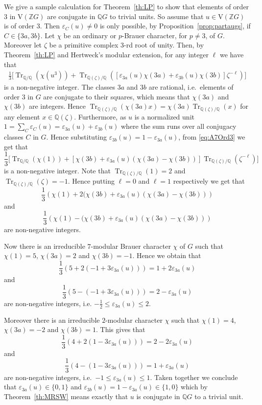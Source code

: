 \documentclass[10pt,a4paper,reqno]{amsart}
\theoremstyle{definition}
\theoremstyle{remark}
\newcommand{\Tr}{\operatorname{Tr}}
\newcommand{\V}{\mathrm{V}}
\newcommand{\ZZ}{\mathbb{Z}}
\newcommand{\QQ}{\mathbb{Q}}
\begin{document}
{We give a sample calculation for Theorem~\ref{th:LP} to show that elements of order $3$ in $\V(\ZZ G)$ are conjugate in $\QQ G$ to trivial units. So assume that $u \in \V(\ZZ G)$ is of order 3. Then $\varepsilon_C(u) \neq 0$ is only possible, by Proposition~\ref{prop:partaugs}, if $C \in \{3a, 3b \}$. Let $\chi$ be an ordinary or $p$-Brauer character, for $p \neq 3$, of $G$. Moreover let $\zeta$ be a primitive complex $3$-rd root of unity. Then, by Theorem~\ref{th:LP} and Hertweck's modular extension, for any integer $\ell$ we have that
\begin{align}\label{eq:A7Ord3}
\frac{1}{3} \Big[ \Tr_{\QQ / \QQ}(\chi(u^3)) + \Tr_{\QQ(\zeta)/\QQ}\left( [ \varepsilon_{3a}(u)\chi(3a) + \varepsilon_{3b}(u)\chi(3b) ] \zeta^{-\ell}\right)  \Big]
\end{align}
is a non-negative integer. The classes $3a$ and $3b$ are rational, i.e.\ elements of order $3$ in $G$ are conjugate to their squares, which means that $\chi(3a)$ and $\chi(3b)$ are integers. Hence $\Tr_{\QQ(\zeta)/\QQ}(\chi(3a)x) = \chi(3a)\Tr_{\QQ(\zeta)/\QQ}(x)$ for any element $x \in \QQ(\zeta)$. Furthermore, as $u$ is a normalized unit $1 = \sum_C \varepsilon_C(u) = \varepsilon_{3a}(u) + \varepsilon_{3b}(u)$ where the sum runs over all conjugacy classes $C$ in $G$. Hence substituting $\varepsilon_{3b}(u) = 1 - \varepsilon_{3a}(u)$, from \eqref{eq:A7Ord3} we get that
$$  \frac{1}{3} \Big[ \Tr_{\QQ / \QQ}(\chi(1)) + \left[\chi(3b) + \varepsilon_{3a}(u)(\chi(3a)-\chi(3b))\right]\Tr_{\QQ(\zeta)/\QQ}(\zeta^{-\ell}) \Big]$$
is a non-negative integer. Note that $\Tr_{\QQ(\zeta)/\QQ}(1) = 2$ and $\Tr_{\QQ(\zeta)/\QQ}(\zeta) = -1$. Hence putting $\ell = 0$ and $\ell = 1$ respectively we get that
$$ \frac{1}{3} \left( \chi(1) + 2 (\chi(3b) + \varepsilon_{3a}(u)(\chi(3a)-\chi(3b)) \right) $$
and
$$ \frac{1}{3} \left( \chi(1) - (\chi(3b) + \varepsilon_{3a}(u)(\chi(3a)-\chi(3b)) \right)$$
are non-negative integers. 

Now there is an irreducible $7$-modular Brauer character $\chi$ of $G$ such that $\chi(1) = 5$, $\chi(3a) = 2$ and $\chi(3b) = -1$. Hence we obtain that
$$\frac{1}{3} \left( 5 + 2 (-1 + 3\varepsilon_{3a}(u)) \right) = 1 + 2\varepsilon_{3a}(u) $$ 
and 
$$\frac{1}{3} \left( 5 - (-1 + 3 \varepsilon_{3a}(u)) \right) = 2 - \varepsilon_{3a}(u) $$
are non-negative integers, i.e. $-\frac{1}{2} \leqslant \varepsilon_{3a}(u) \leqslant 2$.

Moreover there is an irreducible $2$-modular character $\chi$ such that $\chi(1) = 4$, $\chi(3a) = -2$ and $\chi(3b) = 1$. This gives that
$$\frac{1}{3} \left( 4 + 2 (1 - 3\varepsilon_{3a}(u)) \right) = 2 - 2\varepsilon_{3a}(u) $$
and
$$ \frac{1}{3} \left( 4 - (1 -3 \varepsilon_{3a}(u)) \right) = 1 + \varepsilon_{3a}(u)$$
are non-negative integers, i.e.\ $-1 \leqslant \varepsilon_{3a}(u) \leqslant 1$. Taken together we conclude that $\varepsilon_{3a}(u) \in \{0,1 \}$ and $\varepsilon_{3b}(u) = 1 - \varepsilon_{3a}(u) \in \{1, 0\}$ which by Theorem~\ref{th:MRSW} means exactly that $u$ is conjugate in $\QQ G$ to a trivial unit.

}
\end{document}

